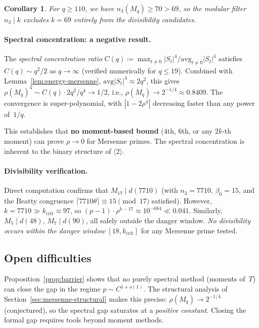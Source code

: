 \documentclass[12pt, a4paper]{amsart}
\theoremstyle{plain}
\newtheorem{corollary}[theorem]{Corollary}
\theoremstyle{definition}
\theoremstyle{remark}
\begin{document}
\begin{corollary}
For $q \geq 110$, we have $n_3(M_q) \geq 70 > 69$,
so the modular filter $n_3 \mid k$ excludes $k = 69$
entirely from the divisibility candidates.
\end{corollary}

\paragraph{Spectral concentration: a negative result.}
The \emph{spectral concentration ratio}
$C(q) \coloneqq \max_{t \neq 0} |S_t|^4 / \mathrm{avg}_{t \neq 0} |S_t|^4$
satisfies $C(q) \sim q^2/2$ as $q \to \infty$
(verified numerically for $q \leq 19$).
Combined with Lemma~\ref{lem:energy-mersenne},
$\mathrm{avg}|S_t|^4 \approx 2q^2$, this gives
$\rho(M_q)^4 \sim C(q) \cdot 2q^2 / q^4 \to 1/2$,
i.e., $\rho(M_q) \to 2^{-1/4} \approx 0.8409$.
The convergence is super-polynomial, with
$|1 - 2\rho^4|$ decreasing faster than any power of~$1/q$.

This establishes that \textbf{no moment-based bound}
(4th, 6th, or any $2k$-th moment) can prove $\rho \to 0$
for Mersenne primes. The spectral concentration is inherent
to the binary structure of $\langle 2 \rangle$.

\paragraph{Divisibility verification.}
Direct computation confirms that $M_{17} \mid d(7710)$
(with $n_3 = 7710$, $\beta_0 = 15$, and the Beatty congruence
$\lceil 7710\theta \rceil \equiv 15 \pmod{17}$ satisfied).
However, $k = 7710 \gg k_{\mathrm{crit}} \approx 97$,
so $(p-1) \cdot \rho^{k-17} \approx 10^{-684} \ll 0.041$.
Similarly, $M_5 \mid d(48)$, $M_7 \mid d(90)$,
all safely outside the danger window.
\emph{No divisibility occurs within the danger window}
$[18, k_{\mathrm{crit}}]$ for any Mersenne prime tested.

\subsection{Open difficulties}

Proposition~\ref{prop:barrier} shows that no purely spectral
method (moments of~$T$) can close the gap in the regime
$p \sim C^{1+o(1)}$.
The structural analysis of Section~\ref{sec:mersenne-structural}
makes this precise: $\rho(M_q) \to 2^{-1/4}$ (conjectured),
so the spectral gap saturates at a \emph{positive constant}.
Closing the formal gap requires tools beyond moment methods.
\end{document}
